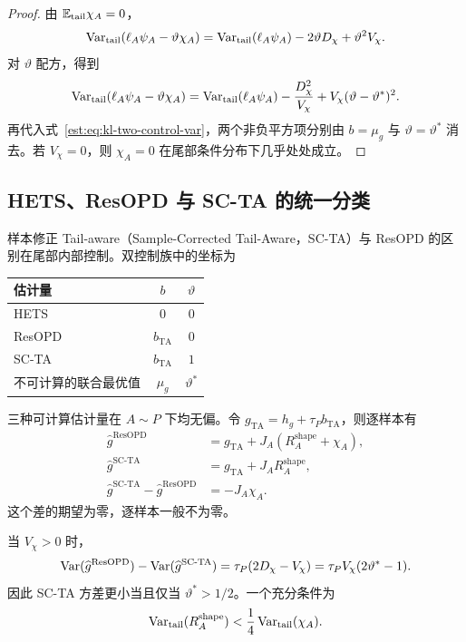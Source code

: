 \begin{proof}
由 $\mathbb E_{\mathrm{tail}}\chi_A=0$，
\begin{equation*}
 \operatorname{Var}_{\mathrm{tail}}(\ell_A\psi_A-\vartheta \chi_A)
 =\operatorname{Var}_{\mathrm{tail}}(\ell_A\psi_A)-2\vartheta D_\chi+\vartheta^2V_\chi.
\end{equation*}
对 $\vartheta$ 配方，得到
\begin{equation*}
 \operatorname{Var}_{\mathrm{tail}}(\ell_A\psi_A-\vartheta \chi_A)
 =\operatorname{Var}_{\mathrm{tail}}(\ell_A\psi_A)-\frac{D_\chi^2}{V_\chi}
  +V_\chi(\vartheta-\vartheta^*)^2.
\end{equation*}
再代入式~\eqref{est:eq:kl-two-control-var}，两个非负平方项分别由 $b=\mu_g$ 与 $\vartheta=\vartheta^*$ 消去。若 $V_\chi=0$，则 $\chi_A=0$ 在尾部条件分布下几乎处处成立。
\end{proof}

\subsection{HETS、ResOPD 与 SC-TA 的统一分类}

样本修正 Tail-aware（Sample-Corrected Tail-Aware，SC-TA）与 ResOPD 的区别在尾部内部控制。双控制族中的坐标为
\begin{center}
\begin{tabular}{lcc}
\toprule
估计量 & $b$ & $\vartheta$\\
\midrule
HETS & $0$ & $0$\\
ResOPD & $b_{\mathrm{TA}}$ & $0$\\
SC-TA & $b_{\mathrm{TA}}$ & $1$\\
不可计算的联合最优值 & $\mu_g$ & $\vartheta^*$\\
\bottomrule
\end{tabular}
\end{center}
三种可计算估计量在 $A\sim P$ 下均无偏。令 $g_{\mathrm{TA}}=h_g+\tau_Pb_{\mathrm{TA}}$，则逐样本有
\begin{align*}
 \widehat g^{\mathrm{ResOPD}}&=g_{\mathrm{TA}}+J_A(R_A^{\mathrm{shape}}+\chi_A),\\
 \widehat g^{\mathrm{SC\text{-}TA}}&=g_{\mathrm{TA}}+J_AR_A^{\mathrm{shape}},\\
 \widehat g^{\mathrm{SC\text{-}TA}}-\widehat g^{\mathrm{ResOPD}}&=-J_A\chi_A.
\end{align*}
这个差的期望为零，逐样本一般不为零。

\begin{proposition}
当 $V_\chi>0$ 时，
\begin{equation*}
 \operatorname{Var}(\widehat g^{\mathrm{ResOPD}})
 -\operatorname{Var}(\widehat g^{\mathrm{SC\text{-}TA}})
 =\tau_P(2D_\chi-V_\chi)
 =\tau_PV_\chi(2\vartheta^*-1).
\end{equation*}
因此 SC-TA 方差更小当且仅当 $\vartheta^*>1/2$。一个充分条件为
\begin{equation*}
 \operatorname{Var}_{\mathrm{tail}}(R_A^{\mathrm{shape}})<\frac14\operatorname{Var}_{\mathrm{tail}}(\chi_A).
\end{equation*}
\end{proposition}

